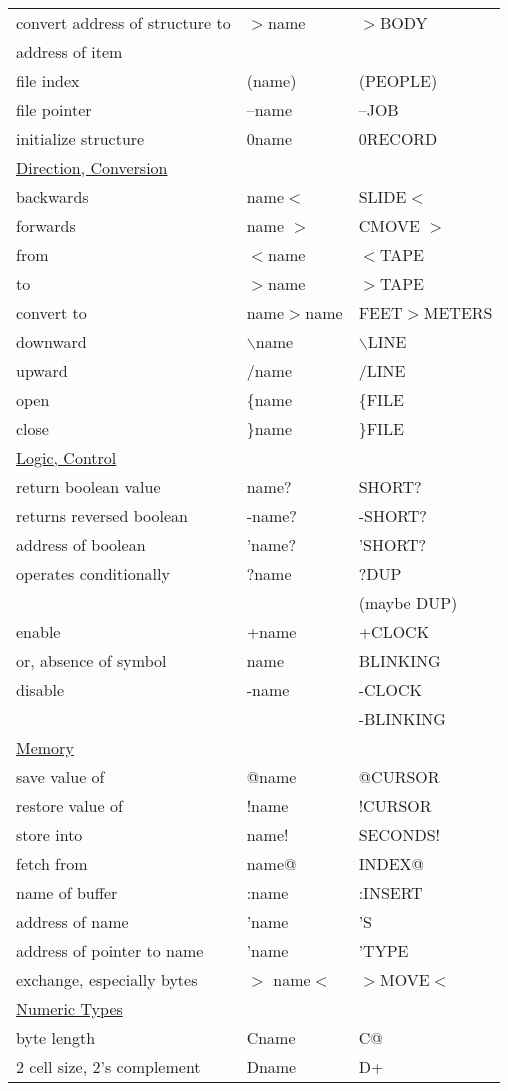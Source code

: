 \begin{longtable}{lll}
convert address of structure to&\(>\)name&\(>\)BODY\\
address of item\\
file index&(name)&(PEOPLE)\\
file pointer&--name&--JOB\\
initialize structure&0name&0RECORD\\[1ex]
\underline{Direction, Conversion}\\
backwards&name\(<\)&SLIDE\(<\)\\
forwards&name \(>\)&CMOVE \(>\)\\
from&\(<\)name&\(<\)TAPE\\
to&\(>\)name&\(>\)TAPE\\
convert to&name\(>\)name&FEET\(>\)METERS\\
downward&$\backslash$name&$\backslash$LINE\\
upward&/name&/LINE\\
open&\{name&\{FILE\\
close&\}name&\}FILE\\[1ex]
\underline{Logic, Control}\\
return boolean value&name?&SHORT?\\
returns reversed boolean&-name?&-SHORT?\\
address of boolean&'name?&'SHORT?\\
operates conditionally&?name&?DUP\\
&&(maybe DUP)\\
enable&+name&+CLOCK\\
or, absence of symbol&name&BLINKING\\
disable&-name&-CLOCK\\
&&-BLINKING\\[1ex]
\underline{Memory}\\
save value of&@name&@CURSOR\\
restore value of&!name&!CURSOR\\
store into&name!&SECONDS!\\
fetch from&name@&INDEX@\\
name of buffer&:name&:INSERT\\
address of name&'name&'S\\
address of pointer to name&'name&'TYPE\\
exchange, especially bytes&\(>\) name\(<\)&\(>\)MOVE\(<\)\\[1ex]
\underline{Numeric Types}\\
byte length&Cname&C@\\
2 cell size, 2's complement&Dname&D+\\

\end{longtable}
